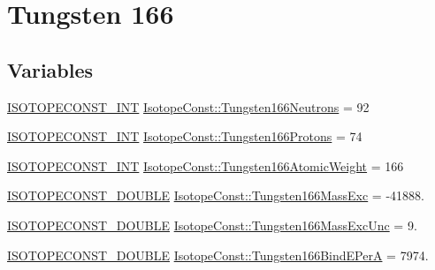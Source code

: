 \hypertarget{group___isotope_const-_tungsten-_w166}{}\section{Tungsten 166}
\label{group___isotope_const-_tungsten-_w166}
\subsection*{Variables}
\begin{DoxyCompactItemize}
\item 
\mbox{\hyperlink{group___isotope_const-_macros_ga5f18360b3e99483a35c32d789e62621c}{I\+S\+O\+T\+O\+P\+E\+C\+O\+N\+S\+T\+\_\+\+I\+NT}} \mbox{\hyperlink{group___isotope_const-_tungsten-_w166_ga52cbfec9af5995b75fcd2271146b6185}{Isotope\+Const\+::\+Tungsten166\+Neutrons}} = 92
\item 
\mbox{\hyperlink{group___isotope_const-_macros_ga5f18360b3e99483a35c32d789e62621c}{I\+S\+O\+T\+O\+P\+E\+C\+O\+N\+S\+T\+\_\+\+I\+NT}} \mbox{\hyperlink{group___isotope_const-_tungsten-_w166_ga7e3114f9051bd3940b377ff1763811cf}{Isotope\+Const\+::\+Tungsten166\+Protons}} = 74
\item 
\mbox{\hyperlink{group___isotope_const-_macros_ga5f18360b3e99483a35c32d789e62621c}{I\+S\+O\+T\+O\+P\+E\+C\+O\+N\+S\+T\+\_\+\+I\+NT}} \mbox{\hyperlink{group___isotope_const-_tungsten-_w166_ga751fb3b75d7505fdf93e96019deaf683}{Isotope\+Const\+::\+Tungsten166\+Atomic\+Weight}} = 166
\item 
\mbox{\hyperlink{group___isotope_const-_macros_ga8f45a7272ce02c0b4c65c44636ed719a}{I\+S\+O\+T\+O\+P\+E\+C\+O\+N\+S\+T\+\_\+\+D\+O\+U\+B\+LE}} \mbox{\hyperlink{group___isotope_const-_tungsten-_w166_ga36ee172ae0394d49dd352c0422df3ed5}{Isotope\+Const\+::\+Tungsten166\+Mass\+Exc}} = -\/41888.
\item 
\mbox{\hyperlink{group___isotope_const-_macros_ga8f45a7272ce02c0b4c65c44636ed719a}{I\+S\+O\+T\+O\+P\+E\+C\+O\+N\+S\+T\+\_\+\+D\+O\+U\+B\+LE}} \mbox{\hyperlink{group___isotope_const-_tungsten-_w166_gafba3fa9e9dfa9ad26e519beba127417c}{Isotope\+Const\+::\+Tungsten166\+Mass\+Exc\+Unc}} = 9.
\item 
\mbox{\hyperlink{group___isotope_const-_macros_ga8f45a7272ce02c0b4c65c44636ed719a}{I\+S\+O\+T\+O\+P\+E\+C\+O\+N\+S\+T\+\_\+\+D\+O\+U\+B\+LE}} \mbox{\hyperlink{group___isotope_const-_tungsten-_w166_gacf41edcf051b66c19b73393d08265ba5}{Isotope\+Const\+::\+Tungsten166\+Bind\+E\+PerA}} = 7974.
\item 

\end{DoxyCompactItemize}
